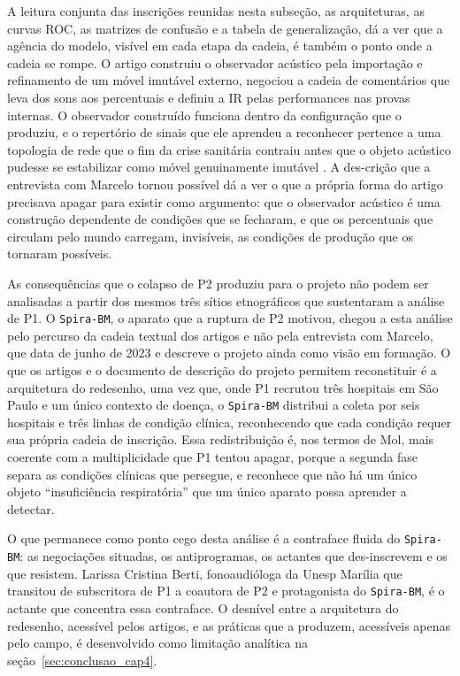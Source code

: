 A leitura conjunta das inscrições reunidas nesta subseção, as arquiteturas, as curvas ROC, as matrizes de confusão e a tabela de generalização, dá a ver que a agência do modelo, visível em cada etapa da cadeia, é também o ponto onde a cadeia se rompe. O artigo construiu o observador acústico pela importação e refinamento de um móvel imutável externo, negociou a cadeia de comentários que leva dos sons aos percentuais e definiu a IR pelas performances nas provas internas. O observador construído funciona dentro da configuração que o produziu, e o repertório de sinais que ele aprendeu a reconhecer pertence a uma topologia de rede que o fim da crise sanitária contraiu antes que o objeto acústico pudesse se estabilizar como móvel genuinamente imutável \parencite{Latour2011CienciaEmAcao}. A des-crição que a entrevista com Marcelo tornou possível dá a ver o que a própria forma do artigo precisava apagar para existir como argumento: que o observador acústico é uma construção dependente de condições que se fecharam, e que os percentuais que circulam pelo mundo carregam, invisíveis, as condições de produção que os tornaram possíveis.

As consequências que o colapso de P2 produziu para o projeto não podem ser analisadas a partir dos mesmos três sítios etnográficos que sustentaram a análise de P1. O \texttt{Spira-BM}, o aparato que a ruptura de P2 motivou, chegou a esta análise pelo percurso da cadeia textual dos artigos e não pela entrevista com Marcelo, que data de junho de 2023 e descreve o projeto ainda como visão em formação. O que os artigos e o documento de descrição do projeto \parencite{Finger2025SPIRABM} permitem reconstituir é a arquitetura do redesenho, uma vez que, onde P1 recrutou três hospitais em São Paulo e um único contexto de doença, o \texttt{Spira-BM} distribui a coleta por seis hospitais e três linhas de condição clínica, reconhecendo que cada condição requer sua própria cadeia de inscrição. Essa redistribuição é, nos termos de Mol, mais coerente com a multiplicidade que P1 tentou apagar, porque a segunda fase separa as condições clínicas que persegue, e reconhece que não há um único objeto \enquote{insuficiência respiratória} que um único aparato possa aprender a detectar.

O que permanece como ponto cego desta análise é a contraface fluida do \texttt{Spira-BM}: as negociações situadas, os antiprogramas, os actantes que des-inscrevem e os que resistem. Larissa Cristina Berti, fonoaudióloga da Unesp Marília que transitou de subscritora de P1 a coautora de P2 e protagonista do \texttt{Spira-BM}, é o actante que concentra essa contraface. O desnível entre a arquitetura do redesenho, acessível pelos artigos, e as práticas que a produzem, acessíveis apenas pelo campo, é desenvolvido como limitação analítica na seção~\ref{sec:conclusao_cap4}.

